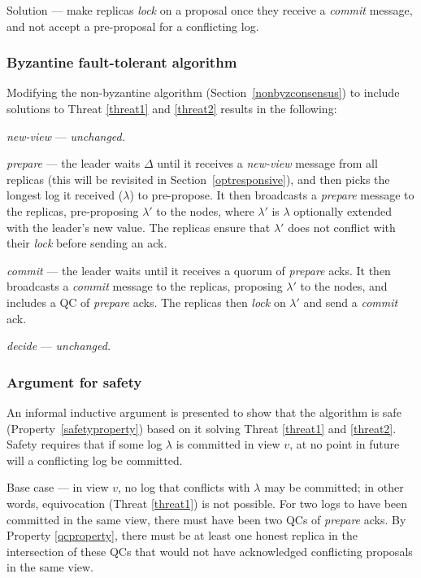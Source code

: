 Solution --- make replicas \textit{lock} on a proposal once they receive a \textit{commit} message, and not accept a pre-proposal for a conflicting log.

\subsubsection{Byzantine fault-tolerant algorithm}
Modifying the non-byzantine algorithm (Section~\ref{nonbyzconsensus}) to include solutions to Threat \ref{threat1} and \ref{threat2} results in the following:

\begin{description}
	\item \textit{new-view} --- \textit{unchanged.}
	\item \textit{prepare} --- the leader waits $\Delta$ until it receives a \textit{new-view} message from all replicas (this will be revisited in Section~\ref{optresponsive}), and then picks the longest log it received ($\lambda$) to pre-propose. It then broadcasts a \textit{prepare} message to the replicas, pre-proposing $\lambda'$ to the nodes, where $\lambda'$ is $\lambda$ optionally extended with the leader's new value. The replicas ensure that $\lambda'$ does not conflict with their \textit{lock} before sending an ack.
	\item \textit{commit} --- the leader waits until it receives a quorum of \textit{prepare} acks. It then broadcasts a \textit{commit} message to the replicas, proposing $\lambda'$ to the nodes, and includes a QC of \textit{prepare} acks. The replicas then \textit{lock} on $\lambda'$ and send a \textit{commit} ack.
	\item \textit{decide} --- \textit{unchanged.}
\end{description}

\subsubsection{Argument for safety} \label{safetyargument}
An informal inductive argument is presented to show that the algorithm is safe (Property~\ref{safetyproperty}) based on it solving Threat \ref{threat1} and \ref{threat2}. Safety requires that if some log $\lambda$ is committed in view $v$, at no point in future will a conflicting log be committed.

Base case --- in view $v$, no log that conflicts with $\lambda$ may be committed; in other words, equivocation (Threat \ref{threat1}) is not possible. For two logs to have been committed in the same view, there must have been two QCs of \textit{prepare} acks. By Property \ref{qcproperty}, there must be at least one honest replica in the intersection of these QCs that would not have acknowledged conflicting proposals in the same view.

